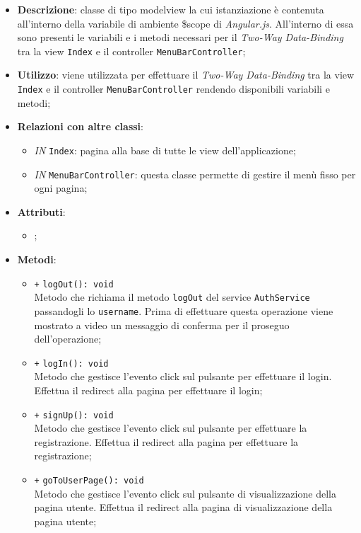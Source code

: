 \begin{itemize}
	\item \textbf{Descrizione}: classe di tipo modelview la cui istanziazione è contenuta all'interno della variabile di ambiente \$scope di \textit{Angular.js}. All'interno di essa sono presenti le variabili e i metodi necessari per il \textit{Two-Way Data-Binding} tra la view \texttt{Index} e il controller \texttt{MenuBarController};
	\item \textbf{Utilizzo}: viene utilizzata per effettuare il \textit{Two-Way Data-Binding} tra la view \texttt{Index} e il controller \texttt{MenuBarController} rendendo disponibili variabili e metodi;
	\item \textbf{Relazioni con altre classi}: 
	\begin{itemize}
		\item \textit{IN} \texttt{Index}: pagina alla base di tutte le view dell'applicazione; 
		\item \textit{IN} \texttt{MenuBarController}: questa classe permette di gestire il menù fisso per ogni pagina;
	\end{itemize}
	\item \textbf{Attributi}: 
	\begin{itemize}
		\item ;
	\end{itemize}
	\item \textbf{Metodi}: 
	\begin{itemize}
		\item \texttt{+} \texttt{logOut(): void} \\
		Metodo che richiama il metodo \texttt{logOut} del service \texttt{AuthService} passandogli lo \texttt{username}. Prima di effettuare questa operazione viene mostrato a video un messaggio di conferma per il proseguo dell'operazione; 
		\item \texttt{+} \texttt{logIn(): void} \\
		Metodo che gestisce l’evento click sul pulsante per effettuare il login. Effettua il redirect alla pagina per effettuare il login; 
		\item \texttt{+} \texttt{signUp(): void} \\
		Metodo che gestisce l’evento click sul pulsante per effettuare la registrazione. Effettua il redirect alla pagina per effettuare la registrazione; 
		\item \texttt{+} \texttt{goToUserPage(): void} \\
		Metodo che gestisce l’evento click sul pulsante di visualizzazione della pagina utente. Effettua il redirect alla pagina di visualizzazione della pagina utente; 

\end{itemize}
\end{itemize}
